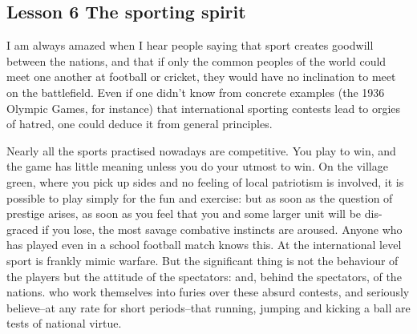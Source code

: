 \documentclass[kindlepaper]{BHCexam4kindle}
\begin{document}
\subsection{Lesson 6
The sporting spirit}
I am always amazed when I hear people saying that sport creates goodwill between
the nations, and that if only the common peoples of the world could meet
one another at football or cricket, they would have no inclination to meet on
the battlefield. Even if one didn't know from concrete examples (the 1936
Olympic Games, for instance) that international sporting contests lead to orgies
of hatred, one could deduce it from general principles.
\par
Nearly all the sports practised nowadays are competitive. You play to win,
and the game has little meaning unless you do your utmost to win. On the village
green, where you pick up sides and no feeling of local patriotism is involved, it
is possible to play simply for the fun and exercise: but as soon as the question of
prestige arises, as soon as you feel that you and some larger unit will be dis-
graced if you lose, the most savage combative instincts are aroused. Anyone who
has played even in a school football match knows this. At the international level
sport is frankly mimic warfare. But the significant thing is not the behaviour of
the players but the attitude of the spectators: and, behind the spectators, of the
nations. who work themselves into furies over these absurd contests, and seriously
believe--at any rate for short periods--that running, jumping and kicking a ball
are tests of national virtue.
\clearpage
\end{document}
